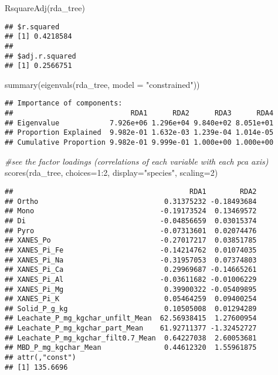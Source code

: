 \documentclass[
]{article}
\newenvironment{Shaded}{\begin{snugshade}}{\end{snugshade}}
\newcommand{\AttributeTok}[1]{\textcolor[rgb]{0.77,0.63,0.00}{#1}}
\newcommand{\CommentTok}[1]{\textcolor[rgb]{0.56,0.35,0.01}{\textit{#1}}}
\newcommand{\DecValTok}[1]{\textcolor[rgb]{0.00,0.00,0.81}{#1}}
\newcommand{\FunctionTok}[1]{\textcolor[rgb]{0.00,0.00,0.00}{#1}}
\newcommand{\NormalTok}[1]{#1}
\newcommand{\SpecialCharTok}[1]{\textcolor[rgb]{0.00,0.00,0.00}{#1}}
\newcommand{\StringTok}[1]{\textcolor[rgb]{0.31,0.60,0.02}{#1}}
\begin{document}
\begin{Shaded}
\begin{Highlighting}[]
\FunctionTok{RsquareAdj}\NormalTok{(rda\_tree)}
\end{Highlighting}
\end{Shaded}

\begin{verbatim}
## $r.squared
## [1] 0.4218584
## 
## $adj.r.squared
## [1] 0.2566751
\end{verbatim}

\begin{Shaded}
\begin{Highlighting}[]
\FunctionTok{summary}\NormalTok{(}\FunctionTok{eigenvals}\NormalTok{(rda\_tree, }\AttributeTok{model =} \StringTok{"constrained"}\NormalTok{))}
\end{Highlighting}
\end{Shaded}

\begin{verbatim}
## Importance of components:
##                            RDA1      RDA2      RDA3      RDA4
## Eigenvalue            7.926e+06 1.296e+04 9.840e+02 8.051e+01
## Proportion Explained  9.982e-01 1.632e-03 1.239e-04 1.014e-05
## Cumulative Proportion 9.982e-01 9.999e-01 1.000e+00 1.000e+00
\end{verbatim}

\begin{Shaded}
\begin{Highlighting}[]
\CommentTok{\#see the factor loadings (correlations of each variable with each pca axis)}
\FunctionTok{scores}\NormalTok{(rda\_tree, }\AttributeTok{choices=}\DecValTok{1}\SpecialCharTok{:}\DecValTok{2}\NormalTok{, }\AttributeTok{display=}\StringTok{"species"}\NormalTok{, }\AttributeTok{scaling=}\DecValTok{2}\NormalTok{)}
\end{Highlighting}
\end{Shaded}

\begin{verbatim}
##                                          RDA1        RDA2
## Ortho                              0.31375232 -0.18493684
## Mono                              -0.19173524  0.13469572
## Di                                -0.04856659  0.03015374
## Pyro                              -0.07313601  0.02074476
## XANES_Po                          -0.27017217  0.03851785
## XANES_Pi_Fe                       -0.14214762  0.01074035
## XANES_Pi_Na                       -0.31957053  0.07374803
## XANES_Pi_Ca                        0.29969687 -0.14665261
## XANES_Pi_Al                       -0.03611682 -0.01006229
## XANES_Pi_Mg                        0.39900322 -0.05409895
## XANES_Pi_K                         0.05464259  0.09400254
## Solid_P_g_kg                       0.10505008  0.01294289
## Leachate_P_mg_kgchar_unfilt_Mean  62.56938415  1.27600954
## Leachate_P_mg_kgchar_part_Mean    61.92711377 -1.32452727
## Leachate_P_mg_kgchar_filt0.7_Mean  0.64227038  2.60053681
## MBD_P_mg_kgchar_Mean               0.44612320  1.55961875
## attr(,"const")
## [1] 135.6696
\end{verbatim}
\end{document}
